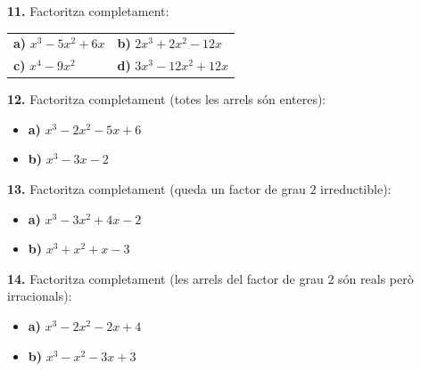 \documentclass[13pt,a4paper]{extarticle}
\begin{document}
\par\noindent\begin{minipage}{\linewidth}
\textbf{11.} Factoritza completament:\par

\begin{tabular}{@{}p{.46\linewidth}p{.46\linewidth}@{}}
\textbf{a)} $x^3-5x^2+6x$ & \textbf{b)} $2x^3+2x^2-12x$ \\[2pt]
\textbf{c)} $x^4-9x^2$ & \textbf{d)} $3x^3-12x^2+12x$ \\[2pt]
\end{tabular}\par
\end{minipage}\par\vspace{1.6mm}
\par\noindent\begin{minipage}{\linewidth}
\textbf{12.} Factoritza completament (totes les arrels són enteres):\par

\begin{itemize}[leftmargin=0pt,itemsep=3pt,topsep=3pt,parsep=0pt,label={}]
\item \textbf{a)} $x^3-2x^2-5x+6$
\item \textbf{b)} $x^3-3x-2$
\end{itemize}
\end{minipage}\par\vspace{1.6mm}
\par\noindent\begin{minipage}{\linewidth}
\textbf{13.} Factoritza completament (queda un factor de grau $2$ irreductible):\par

\begin{itemize}[leftmargin=0pt,itemsep=3pt,topsep=3pt,parsep=0pt,label={}]
\item \textbf{a)} $x^3-3x^2+4x-2$
\item \textbf{b)} $x^3+x^2+x-3$
\end{itemize}
\end{minipage}\par\vspace{1.6mm}
\par\noindent\begin{minipage}{\linewidth}
\textbf{14.} Factoritza completament (les arrels del factor de grau $2$ són reals però irracionals):\par

\begin{itemize}[leftmargin=0pt,itemsep=3pt,topsep=3pt,parsep=0pt,label={}]
\item \textbf{a)} $x^3-2x^2-2x+4$
\item \textbf{b)} $x^3-x^2-3x+3$
\end{itemize}
\end{minipage}\par\vspace{1.6mm}
\end{document}
